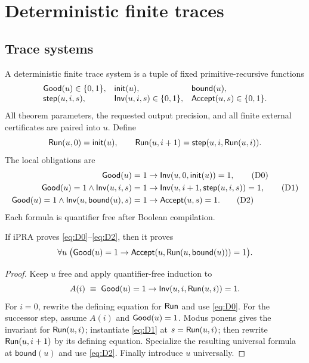 \section{Deterministic finite traces}
\label{sec:deterministic}

\subsection{Trace systems}

A deterministic finite trace system is a tuple of fixed primitive-recursive functions
\[
\begin{array}{lll}
  \mathsf{Good}(u)\in\{0,1\}, & \mathsf{init}(u), & \mathsf{bound}(u),\\
  \mathsf{step}(u,i,s), & \mathsf{Inv}(u,i,s)\in\{0,1\}, & \mathsf{Accept}(u,s)\in\{0,1\}.
\end{array}
\]
All theorem parameters, the requested output precision, and all finite external certificates are paired into $u$.  Define
\[
\mathsf{Run}(u,0)=\mathsf{init}(u),\qquad
\mathsf{Run}(u,i+1)=\mathsf{step}(u,i,\mathsf{Run}(u,i)).
\]
The local obligations are
\begin{align}
 \mathsf{Good}(u)=1&\to \mathsf{Inv}(u,0,\mathsf{init}(u))=1, \tag{D0}\label{eq:D0}\\
 \mathsf{Good}(u)=1\wedge \mathsf{Inv}(u,i,s)=1&\to
   \mathsf{Inv}(u,i+1,\mathsf{step}(u,i,s))=1, \tag{D1}\label{eq:D1}\\
 \mathsf{Good}(u)=1\wedge \mathsf{Inv}(u,\mathsf{bound}(u),s)=1&\to
   \mathsf{Accept}(u,s)=1. \tag{D2}\label{eq:D2}
\end{align}
Each formula is quantifier free after Boolean compilation.

\begin{theorem}
\label{thm:det-trace}
If iPRA proves \eqref{eq:D0}--\eqref{eq:D2}, then it proves
\[
 \forall u\;\bigl(\mathsf{Good}(u)=1\to
 \mathsf{Accept}(u,\mathsf{Run}(u,\mathsf{bound}(u)))=1\bigr).
\]
\end{theorem}

\begin{proof}
Keep $u$ free and apply quantifier-free induction to
\[
 A(i)\;\equiv\;\mathsf{Good}(u)=1\to\mathsf{Inv}(u,i,\mathsf{Run}(u,i))=1.
\]
For $i=0$, rewrite the defining equation for $\mathsf{Run}$ and use \eqref{eq:D0}.  For the successor step, assume $A(i)$ and $\mathsf{Good}(u)=1$.  Modus ponens gives the invariant for $\mathsf{Run}(u,i)$; instantiate \eqref{eq:D1} at $s=\mathsf{Run}(u,i)$; then rewrite $\mathsf{Run}(u,i+1)$ by its defining equation.  Specialize the resulting universal formula at $\mathsf{bound}(u)$ and use \eqref{eq:D2}.  Finally introduce $u$ universally.
\end{proof}

